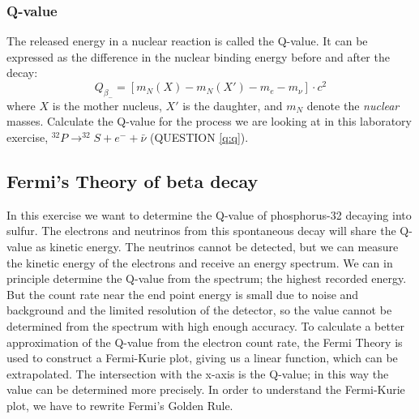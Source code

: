 \documentclass[a4,11pt, notitlepage]{article}
\begin{document}
\subsubsection{Q-value}

The released energy in a nuclear reaction is called the Q-value. It can be expressed as the difference in the nuclear binding energy before and after the decay: \begin{equation}
  Q_{\beta_-}=[m_{N}(X)-m_{N}(X')-m_e-m_{\nu}]\cdot c^2
\end{equation}
where $X$ is the mother nucleus, $X'$ is the daughter, and $m_N$ denote the \textit{nuclear} masses. Calculate the Q-value for the process we are looking at in this laboratory exercise, $^{32}P\rightarrow ^{32}S + e^- + \bar{\nu}$ (QUESTION \ref{q:q}). 


%
%
%


\subsection{Fermi's Theory of beta decay}

In this exercise we want to determine the Q-value of phosphorus-32
decaying into sulfur. The electrons and neutrinos from this
spontaneous decay will share the Q-value as kinetic energy. The
neutrinos cannot be detected, but we can measure the kinetic energy of
the electrons and receive an energy spectrum. We can in principle
determine the Q-value from the spectrum; the highest recorded
energy. But the count rate near the end point energy is small due to
noise and background and the limited resolution of the detector, so
the value cannot be determined from the spectrum with high enough
accuracy. To calculate a better approximation of the Q-value from the
electron count rate, the Fermi Theory is used to construct a
Fermi-Kurie plot, giving us a linear function, which can be
extrapolated. The intersection with the x-axis is the Q-value; in this
way the value can be determined more precisely. In order to understand
the Fermi-Kurie plot, we have to rewrite Fermi's Golden Rule.
\end{document}
